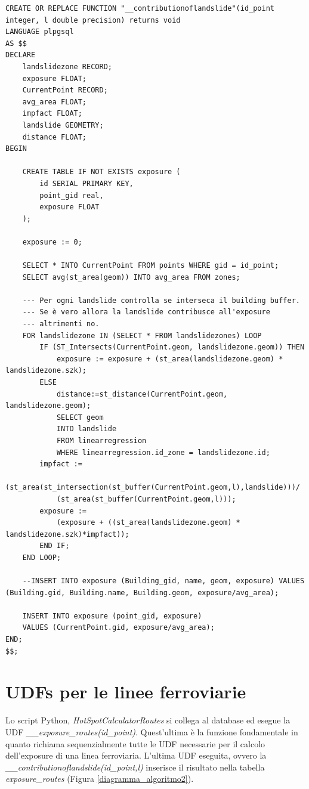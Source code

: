 \begin{lstlisting}[style = mystyle]
CREATE OR REPLACE FUNCTION "__contributionoflandslide"(id_point integer, l double precision) returns void
LANGUAGE plpgsql
AS $$
DECLARE
	landslidezone RECORD;
	exposure FLOAT;
	CurrentPoint RECORD;
	avg_area FLOAT;
	impfact FLOAT;
	landslide GEOMETRY;
	distance FLOAT;
BEGIN

	CREATE TABLE IF NOT EXISTS exposure (
		id SERIAL PRIMARY KEY,
		point_gid real,
		exposure FLOAT
	);

	exposure := 0;
	
	SELECT * INTO CurrentPoint FROM points WHERE gid = id_point;
	SELECT avg(st_area(geom)) INTO avg_area FROM zones;
	
	--- Per ogni landslide controlla se interseca il building buffer.
	--- Se è vero allora la landslide contribusce all'exposure
	--- altrimenti no.
	FOR landslidezone IN (SELECT * FROM landslidezones) LOOP
		IF (ST_Intersects(CurrentPoint.geom, landslidezone.geom)) THEN
			exposure := exposure + (st_area(landslidezone.geom) * landslidezone.szk);
		ELSE
			distance:=st_distance(CurrentPoint.geom, landslidezone.geom);
			SELECT geom 
			INTO landslide 
			FROM linearregression 
			WHERE linearregression.id_zone = landslidezone.id;
		impfact :=
			(st_area(st_intersection(st_buffer(CurrentPoint.geom,l),landslide)))/
			(st_area(st_buffer(CurrentPoint.geom,l)));
		exposure := 
			(exposure + ((st_area(landslidezone.geom) * landslidezone.szk)*impfact));
		END IF;
	END LOOP;

	--INSERT INTO exposure (Building_gid, name, geom, exposure) VALUES (Building.gid, Building.name, Building.geom, exposure/avg_area);
	
	INSERT INTO exposure (point_gid, exposure) 
	VALUES (CurrentPoint.gid, exposure/avg_area);
END;
$$;
\end{lstlisting}

\newpage

\section{UDFs per le linee ferroviarie}

Lo script Python, \textit{HotSpotCalculatorRoutes} si collega al database ed esegue la UDF  \textit{\_\_exposure\_routes(id\_point)}. Quest'ultima è la funzione fondamentale in quanto richiama sequenzialmente tutte le UDF necessarie per il calcolo dell'exposure di una linea ferroviaria. L'ultima UDF eseguita, ovvero la \textit{\_\_contributionoflandslide(id\_point,l)} inserisce il risultato nella tabella \textit{exposure\_routes} (Figura \ref{diagramma_algoritmo2}).


